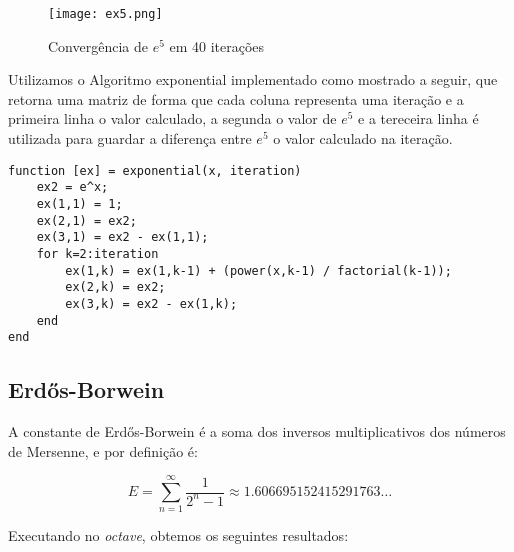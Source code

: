 \begin{figure}[H] \centering
	\texttt{[image: ex5.png]} 
\caption{Convergência de $e^5$ em 40 iterações}
\label{ex5} 
\end{figure}

Utilizamos o Algoritmo exponential implementado como mostrado a seguir,
que retorna uma matriz de forma que cada coluna representa uma iteração e
a primeira linha o valor calculado, a segunda o valor de $e^5$ e a
tereceira linha é utilizada para guardar a diferença entre $e^5$ o valor
calculado na iteração.

\begin{lstlisting}
function [ex] = exponential(x, iteration)
	ex2 = e^x;
	ex(1,1) = 1;
	ex(2,1) = ex2;
	ex(3,1) = ex2 - ex(1,1);
	for k=2:iteration
		ex(1,k) = ex(1,k-1) + (power(x,k-1) / factorial(k-1));
		ex(2,k) = ex2;
		ex(3,k) = ex2 - ex(1,k);
	end
end
\end{lstlisting}

\subsection{Erdős-Borwein}

A constante de Erdős-Borwein é a soma dos inversos multiplicativos dos números
de Mersenne, e por definição é:

\begin{equation}
	E = \displaystyle\sum_{n=1}^{\infty} \frac{1}{2^n-1} \approx 1.606695152415291763\dots
\end{equation}

Executando no \emph{octave}, obtemos os seguintes resultados:

